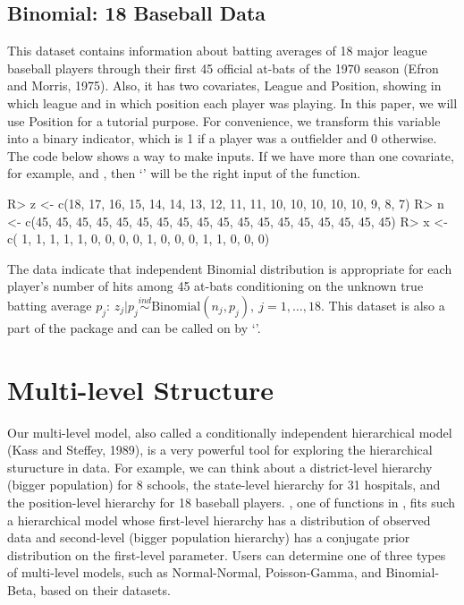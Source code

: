 \documentclass[article]{jss}
\begin{document}
\subsection{Binomial: 18 Baseball Data}
This dataset contains information about batting averages of 18 major league baseball players through their first 45 official at-bats of the 1970 season (Efron and Morris, 1975). Also, it has two covariates, League and Position, showing in which league and in which position each player was playing. In this paper, we will use Position for a tutorial purpose. For convenience, we transform this variable into a binary indicator, which is 1 if a player was a outfielder and 0 otherwise. The code below shows a way to make inputs. If we have more than one covariate, for example,  and , then `' will be the right input of the  function.
\begin{CodeChunk}
\begin{CodeInput}
R> z <- c(18, 17, 16, 15, 14, 14, 13, 12, 11, 11, 10, 10, 10, 10, 10,  9,  8,  7)
R> n <- c(45, 45, 45, 45, 45, 45, 45, 45, 45, 45, 45, 45, 45, 45, 45, 45, 45, 45)
R> x <- c( 1,  1,  1,  1,  1,  0,  0,  0,  0,  1,  0,  0,  0,  1,  1,  0,  0,  0) 
\end{CodeInput}
\end{CodeChunk}
The data indicate that independent Binomial distribution is appropriate for each player's number of hits among 45 at-bats conditioning on the unknown true batting average $p_{j}$: $z_{j}\vert p_{j}\stackrel{ind}{\sim} \textrm{Binomial}(n_{j}, p_{j}), ~j=1, \ldots, 18$. This dataset is also a part of the package and can be called on  by `'.

\section[Multi-level Structure]{Multi-level Structure}
Our multi-level model, also called a conditionally independent hierarchical model (Kass and Steffey, 1989), is a very powerful tool for exploring the hierarchical sturucture in data. For example, we can think about a district-level hierarchy (bigger population) for 8 schools, the state-level hierarchy for 31 hospitals, and the position-level hierarchy for 18 baseball players. , one of functions in , fits such a hierarchical model whose first-level hierarchy has a distribution of observed data and second-level (bigger population hierarchy) has a conjugate prior distribution on the first-level parameter. Users can determine one of three types of multi-level models, such as Normal-Normal, Poisson-Gamma, and Binomial-Beta, based on their datasets. 
\\
\end{document}
